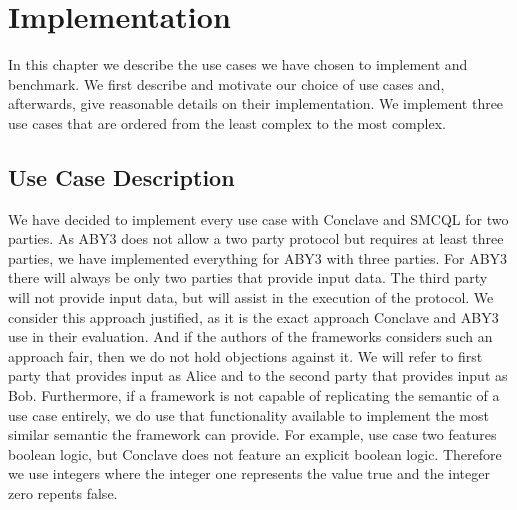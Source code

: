 \chapter{Implementation}
\label{Implementation}	
In this chapter we describe the use cases we have chosen to implement and benchmark. We first describe and motivate our choice of use cases and, afterwards, give reasonable details on their implementation. We implement three use cases that are ordered from the least complex to the most complex.
\section{Use Case Description}
\label{Use Case}	 
We have decided to implement every use case with Conclave and SMCQL for two parties. As ABY3 does not allow a two party protocol but requires at least three parties, we have implemented everything for ABY3 with three parties. For ABY3 there will always be only two parties that provide input data. The third party will not provide input data, but will assist in the execution of the protocol. We consider this approach justified, as it is the exact approach Conclave and ABY3 use in their evaluation. And if the authors of the frameworks considers such an approach fair, then we do not hold objections against it.  
We will refer to first party that provides input as Alice and to the second party that provides input as Bob. Furthermore, if a framework is not capable of replicating the semantic of a use case entirely, we do use that functionality available to implement the most similar semantic the framework can provide. For example, use case two features boolean logic, but Conclave does not feature an explicit boolean logic. Therefore we use integers where the integer one represents the value true and the integer zero repents false.   
